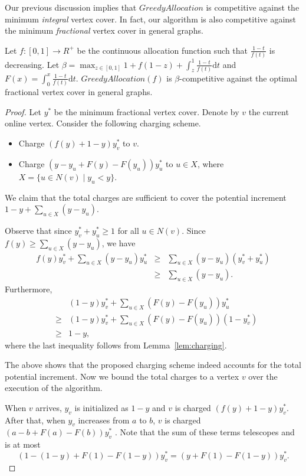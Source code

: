 \documentclass{article}
\begin{document}
Our previous discussion implies that $GreedyAllocation$ is competitive against the minimum {\em integral} vertex cover. In fact, our algorithm is also competitive against the minimum {\em fractional} vertex cover in general graphs.
\begin{theorem}
Let $f: [0,1]\longrightarrow R^+$ be the continuous allocation function such that $\frac{1-t}{f(t)}$ is decreasing.
Let $\beta=\max_{z\in [0,1]} 1+f(1-z)+\int_z^1 \frac{1-t}{f(t)}\mathrm{d}t$ and $F(x)=\int_0^x  \frac{1-t}{f(t)}\mathrm{d}t$. 
$GreedyAllocation(f)$ is $\beta$-competitive against the optimal fractional vertex cover in general graphs.
\end{theorem}
\begin{proof}
Let $ y^*$ be the minimum fractional vertex cover. Denote by $v$ the current online vertex. Consider the following charging scheme.
\begin{itemize}
\item Charge $\left(f(y)+1-y\right)y_v^*$ to $v$.
\item Charge $\left(y-y_u+F(y)-F(y_u)\right)y_u^*$ to $u\in X$, where $X=\{ u\in N(v)\mid y_u<y\}$.
\end{itemize}
We claim that the total charges are sufficient to cover the potential increment $1-y+\sum_{u\in X}(y-y_u)$.

Observe that since $y_v^*+y_u^*\geq 1$ for all $u\in N(v)$. Since $f(y)\geq \sum_{u\in X}(y-y_u)$, we have 
\begin{eqnarray*}
f(y)y_v^*+\sum_{u\in X}(y-y_u)y_u^* & \geq & \sum_{u\in X}(y-y_u)(y_v^*+y_u^*)\\
             & \geq &  \sum_{u\in X}(y-y_u).
\end{eqnarray*}
Furthermore,
\begin{eqnarray*}
&&(1-y)y_v^*+\sum_{u\in X}\left(F(y)-F(y_u)\right)y_u^* \\
&\geq&  (1-y)y_v^*+\sum_{u\in X}\left(F(y)-F(y_u)\right)(1-y_v^*)\\
&\geq&   1-y,
\end{eqnarray*}
where the last inequality follows from Lemma~\ref{lem:charging}.

The above shows that the proposed charging scheme indeed accounts for the total potential increment. Now we bound the total charges to a vertex $v$ over the execution of the algorithm.

When $v$ arrives, $y_v$ is initialized as $1-y$ and $v$ is charged $\left(f(y)+1-y\right)y_v^*$. After that, when $y_v$ increases from $a$ to $b$, $v$ is charged $\left(a-b+F(a)-F(b)\right)y_v^*$ . Note that the sum of these terms telescopes and is at most $$\left(1-(1-y)+F(1)-F(1-y)\right)y_v^*=\left(y+F(1)-F(1-y)\right)y_v^*.$$


\end{proof}
\end{document}
